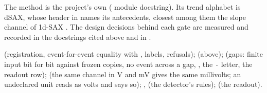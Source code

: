The method is the project's own ( module docstring). Its trend alphabet is
dSAX, whose header in  names its antecedents,
closest among them the slope channel of 1d-SAX \citep{malinowski2013onedsax}. The design
decisions behind each gate are measured and recorded in the docstrings cited above and in
.

 (registration, event-for-event equality with
, labels, refusals);  (above);
 (gaps: finite input bit for bit against frozen copies,
no event across a gap, , the \texttt{-} letter, the readout row);
 (the same channel in V and mV gives the same
millivolts; an undeclared unit reads as volts and says so);
,  (the
detector's rules);  (the readout).
